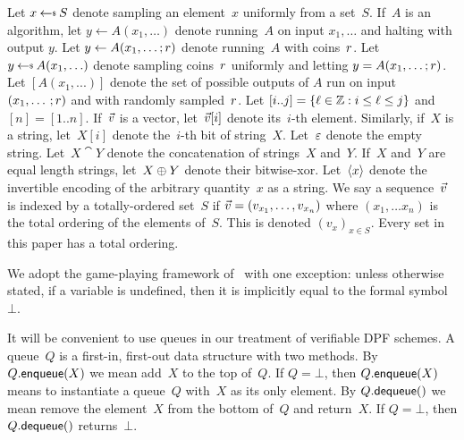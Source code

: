 %
\label{sec-prelims}

Let $x \getsr S$ denote sampling an element~$x$ uniformly from a set~$S$.
%
If~$A$ is an algorithm, let $y \gets A(x_1, \ldots)$ denote running~$A$ on input
$x_1, \ldots$ and halting with output $y$.
%
Let $y \gets A(x_1, \ldots; r)$ denote running~$A$ with coins~$r$.
Let $y \getsr A(x_1, \ldots)$ denote sampling coins~$r$ uniformly and
letting $y = A(x_1, \ldots; r)$.
%
Let $[A(x_1, ...)]$ denote the set of possible outputs of $A$ run on input
$(x_1, \ldots \,; r)$ and with randomly sampled~$r$.
%
Let $[i..j] = \{ \ell \in \mathbb{Z} : i \le \ell \le j \}$ and $[n] = [1..n]$.
%
If~$\vec{v}$ is a vector, let~$\vec{v}[i]$ denote its~$i$-th element. Similarly,
if~$X$ is a string, let~$X[i]$ denote the~$i$-th bit of string~$X$.
%
Let~$\varepsilon$ denote the empty string.
%
Let~$X \cat Y$ denote the concatenation of strings~$X$ and~$Y$.
%
If~$X$ and~$Y$ are equal length strings, let~$X \mathbin{\oplus} Y$ denote their
bitwise-xor.
Let~$\langle x \rangle$ denote the invertible encoding of the arbitrary quantity~$x$ as a
string.
%
We say a sequence~$\vec{v}$ is indexed by a totally-ordered set~$S$ if $\vec{v} =
(v_{x_1}, \ldots, v_{x_n})$ where $(x_1, \ldots x_n)$ is the total ordering of
the elements of~$S$. This is denoted $(v_x)_{x\in S}$. Every set in this paper
has a total ordering.

We adopt the game-playing framework of~\cite{games} with one exception: unless
otherwise stated, if a variable is undefined, then it is implicitly equal to the
formal symbol~$\bot$.~

It will be convenient to use queues in our treatment of verifiable DPF schemes.
A queue~$Q$ is a first-in, first-out data structure with two methods.
%
By $Q.\mathsf{enqueue}(X)$ we mean add~$X$ to the top of~$Q$. If $Q=\bot$, then
$Q.\mathsf{enqueue}(X)$ means to instantiate a queue~$Q$ with~$X$ as its only element.
%
By $Q.\mathsf{dequeue}()$ we mean remove the element~$X$ from the bottom of~$Q$ and
return~$X$. If $Q = \bot$, then $Q.\mathsf{dequeue}()$ returns~$\bot$.


